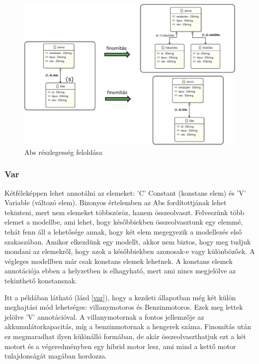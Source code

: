 \begin{figure}[htp]
	\centering
	\includegraphics[width=130mm, keepaspectratio]{figures/abs.pdf}
	\caption{Abs részlegesség feloldása} 
	\label{abs}
\end{figure}

\subsubsection{Var}
Kétféleképpen lehet annotálni az elemeket: \textsf{’C’} Constant (konstans elem) és \textsf{’V’} Variable (változó elem). Bizonyos értelemben az Abs fordítottjának lehet tekinteni, mert nem elemeket többszöröz, hanem összeolvaszt. Felveszünk több elemet a modellbe, ami lehet, hogy későbbiekben összeolvasztunk egy elemmé, tehát fenn áll a lehetősége annak, hogy két elem megegyezik a modellezés első szakaszában. Amikor elkezdünk egy modellt, akkor nem biztos, hogy meg tudjuk mondani az elemekről, hogy azok a későbbiekben azonosak-e vagy különbözőek. A végleges modellben már csak konstans elemek lehetnek. A konstans elemek annotációja ebben a helyzetben is elhagyható, mert ami nincs megjelölve az tekinthető konstansnak.
\par
Itt a példában látható (lásd \autoref{var}), hogy a kezdeti állapotban még két külön meghajtási mód lehetséges: villanymotoros és Benzinmotoros. Ezek meg lettek jelölve \textsf{'V'} annotációval. A villanymotornak a fontos jellemzője az akkumulátorkapacitás, míg a benzinmotornak a hengerek száma. Finomítás után ez megmaradhat ilyen különálló formában, de akár összeolvaszthatjuk ezt a két motort és a végeredményben egy hibrid motor lesz, ami mind a kettő motor tulajdonságát magában hordozza.

